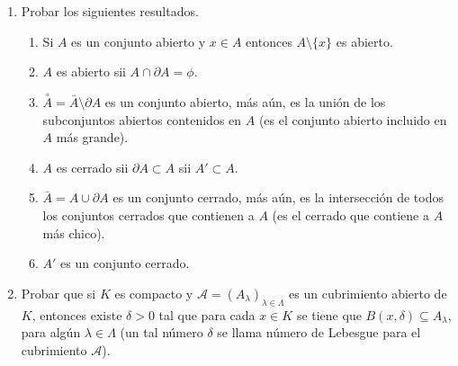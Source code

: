 \documentclass[11pt]{article}
\begin{document}
\begin{enumerate}
\begin{enumerate}
       \end{enumerate}

\item Probar los siguientes resultados.
       \begin{enumerate}
         \item Si $A$ es un conjunto abierto y $x\in A$ entonces
           $A\setminus\{ x\}$ es abierto.
         \item $A$ es abierto sii $A\cap\partial A=\phi$.
         \item $\stackrel{\circ}{A}=\bar{A}\setminus\partial A$ es un conjunto
           abierto, m\'as a\'un, es la uni\'on de los subconjuntos
           abiertos contenidos en $A$ (es el conjunto abierto incluido
           en $A$ m\'as grande).
         \item $A$ es cerrado sii $\partial A\subset A$ sii $A' \subset
           A$. 
         \item $\bar{A}=A\cup\partial A$ es un conjunto cerrado, m\'as
           a\'un, es la intersecci\'on de todos los conjuntos cerrados
           que contienen a $A$ (es el cerrado que contiene a $A$ m\'as
           chico).
         \item $A'$ es un conjunto cerrado.
       \end{enumerate}
       
\item Probar que si $K$ es compacto y
      $\mathcal{A}=(A_\lambda)_{\lambda\in\Lambda}$ es un cubrimiento
      abierto de 
      $K$, entonces existe $\delta>0$ tal que para cada $x\in K$ se tiene
      que $B(x,\delta)\subseteq A_\lambda$, para alg\'un
      $\lambda\in\Lambda$  (un tal n\'umero $\delta$ se llama n\'umero
      de Lebesgue para el cubrimiento $\mathcal{A}$).        





\end{enumerate}
\end{document}
